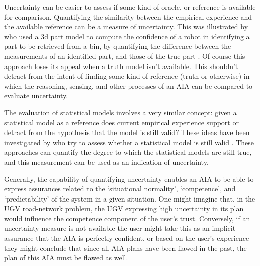     Uncertainty can be easier to assess if some kind of oracle, or reference is available for comparison. Quantifying the similarity between the empirical experience and the available reference can be a measure of uncertainty. This was illustrated by \cite{Kaipa2015-hy} who used a 3d part model to compute the confidence of a robot in identifying a part to be retrieved from a bin, by quantifying the difference between the measurements of an identified part, and those of the true part . 
    Of course this approach loses its appeal when a truth model isn't available. This shouldn't detract from the intent of finding some kind of reference (truth or otherwise) in which the reasoning, sensing, and other processes of an AIA can be compared to evaluate uncertainty.

    The evaluation of statistical models involves a very similar concept: given a statistical model as a reference does current empirical experience support or detract from the hypothesis that the model is still valid? These ideas have been investigated by \cite{Laskey1991-mf, Laskey1995-jp, Laskey2015-gz, Zagorecki2015-qy, Habbema1976-xd, Ghosh2016-dl} who try to assess whether a statistical model is still valid . These approaches can quantify the degree to which the statistical models are still true, and this measurement can be used as an indication of uncertainty.

    Generally, the capability of quantifying uncertainty enables an AIA to be able to express assurances related to the `situational normality', `competence', and `predictability' of the system in a given situation. One might imagine that, in the UGV road-network problem, the UGV expressing high uncertainty in its plan would influence the competence component of the user's trust. Conversely, if an uncertainty measure is not available the user might take this as an implicit assurance that the AIA is perfectly confident, or based on the user's experience they might conclude that since all AIA plans have been flawed in the past, the plan of this AIA must be flawed as well.

